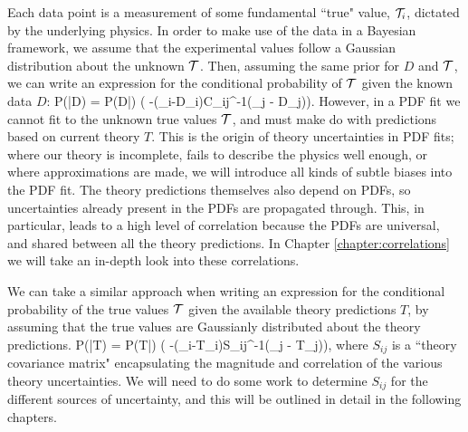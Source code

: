 Each data point is a measurement of some fundamental ``true" value, $\mathcal{T}_i$, dictated by the underlying physics. In order to make use of the data in a Bayesian framework, we assume that the experimental values follow a Gaussian distribution about the unknown $\mathcal{T}$. Then, assuming the same prior for $D$ and $\mathcal{T}$, we can write an expression for the conditional probability of $\mathcal{T}$ given the known data $D$:
\beq
\label{eqn:gaussexp}
P(\truev|D) = P(D|\truev) \propto \exp\bigg( -(\truev_i-D_i)C_{ij}^{-1}(\truev_j - D_j)\bigg).
\eeq
However, in a PDF fit we cannot fit to the unknown true values $\mathcal{T}$, and must make do with predictions based on current theory $T$. This is the origin of theory uncertainties in PDF fits; where our theory is incomplete, fails to describe the physics well enough, or where approximations are made, we will introduce all kinds of subtle biases into the PDF fit. The theory predictions themselves also depend on PDFs, so uncertainties already present in the PDFs are propagated through. This, in particular, leads to a high level of correlation because the PDFs are universal, and shared between all the theory predictions. In Chapter \ref{chapter:correlations} we will take an in-depth look into these correlations.

We can take a similar approach when writing an expression for the conditional probability of the true values $\mathcal{T}$ given the available theory predictions $T$, by assuming that the true values are Gaussianly distributed about the theory predictions.
\beq
\label{eqn:gausstheory}
P(\truev|T) = P(T|\truev) \propto \exp\bigg( -(\truev_i-T_i)S_{ij}^{-1}(\truev_j - T_j)\bigg),
\eeq
where $S_{ij}$ is a ``theory covariance matrix" encapsulating the magnitude and correlation of the various theory uncertainties. We will need to do some work to determine $S_{ij}$ for the different sources of uncertainty, and this will be outlined in detail in the following chapters. 

